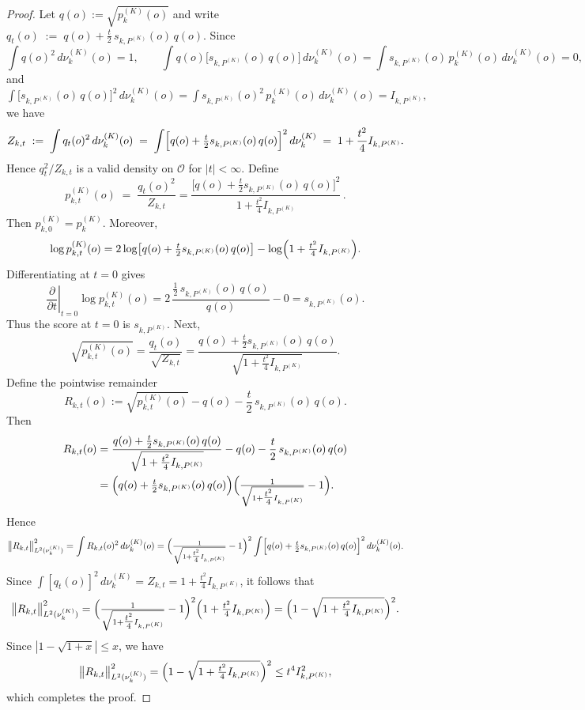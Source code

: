 \documentclass[11pt]{article}
\theoremstyle{plain}
\theoremstyle{definition}
\theoremstyle{remark}
\theoremstyle{definition}
\begin{document}
\begin{proof}
Let $q(o):=\sqrt{p_k^{(K)}(o)}$ and write $q_t(o)\;:=\;q(o)+\frac{t}{2}\,s_{k,P^{(K)}}(o)\,q(o).$
Since 
\[
\int q(o)^2\,d\nu_k^{(K)}(o)=1,\qquad
\int q(o)\bigl[s_{k,P^{(K)}}(o)\,q(o)\bigr]\,d\nu_k^{(K)}(o)
=\int s_{k,P^{(K)}}(o)\,p_k^{(K)}(o)\,d\nu_k^{(K)}(o)=0,
\]
and $\int\bigl[s_{k,P^{(K)}}(o)\,q(o)\bigr]^2\,d\nu_k^{(K)}(o)
=\int s_{k,P^{(K)}}(o)^2\,p_k^{(K)}(o)\,d\nu_k^{(K)}(o)
=I_{k,P^{(K)}},$
we have
\[
Z_{k,t}\;:=\;\int q_t(o)^2\,d\nu_k^{(K)}(o)
\;=\;\int\Bigl[q(o)+\tfrac{t}{2}s_{k,P^{(K)}}(o)\,q(o)\Bigr]^2\,d\nu_k^{(K)}
\;=\;1+\frac{t^2}{4}I_{k,P^{(K)}}.
\]
Hence $q_t^2/Z_{k,t}$ is a valid density on $\mathcal O$ for $|t| < \infty$.  Define
\[
p_{k,t}^{(K)}(o)\;=\;\frac{q_t(o)^2}{Z_{k,t}}
=\frac{\bigl[q(o)+\tfrac{t}{2}s_{k,P^{(K)}}(o)\,q(o)\bigr]^2}
{\,1+\tfrac{t^2}{4}I_{k,P^{(K)}}\,}\,.
\]
Then $p_{k,0}^{(K)}=p_k^{(K)}$.  Moreover, 
\[
\log p_{k,t}^{(K)}(o)
=2\log\bigl[q(o)+\tfrac{t}{2}s_{k,P^{(K)}}(o)\,q(o)\bigr]
-\log\Bigl(1+\tfrac{t^2}{4}I_{k,P^{(K)}}\Bigr).
\]
Differentiating at $t=0$ gives
\[
\left.\frac{\partial}{\partial t}\right|_{t=0}\log p_{k,t}^{(K)}(o)
=2\,\frac{\tfrac12\,s_{k,P^{(K)}}(o)\,q(o)}{q(o)}-0
=s_{k,P^{(K)}}(o).
\]
Thus the score at $t=0$ is $s_{k,P^{(K)}}$.  Next, 
\[
\sqrt{p_{k,t}^{(K)}(o)}
=\frac{q_t(o)}{\sqrt{Z_{k,t}}}
=\frac{q(o)+\tfrac{t}{2}s_{k,P^{(K)}}(o)\,q(o)}{\sqrt{1+\tfrac{t^2}{4}I_{k,P^{(K)}}}}.
\]
Define the pointwise remainder
\[
R_{k,t}(o)
:=\sqrt{p_{k,t}^{(K)}(o)}-q(o)-\frac{t}{2}\,s_{k,P^{(K)}}(o)\,q(o).
\]
Then
\begin{align*}
R_{k,t}(o)
&=\frac{q(o)+\tfrac{t}{2}s_{k,P^{(K)}}(o)\,q(o)}{\sqrt{1+\tfrac{t^2}{4}I_{k,P^{(K)}}}}
-q(o)-\frac{t}{2}\,s_{k,P^{(K)}}(o)\,q(o)\\
&=\Bigl(q(o)+\tfrac{t}{2}s_{k,P^{(K)}}(o)\,q(o)\Bigr)
\Bigl(\tfrac{1}{\sqrt{1+\tfrac{t^2}{4}I_{k,P^{(K)}}}}-1\Bigr).
\end{align*}
Hence 
\[
\bigl\lVert R_{k,t}\bigr\rVert_{L^2(\nu_k^{(K)})}^2
=\int R_{k,t}(o)^2\,d\nu_k^{(K)}(o)
=\Bigl(\tfrac{1}{\sqrt{1+\tfrac{t^2}{4}I_{k,P^{(K)}}}}-1\Bigr)^2
\int\Bigl[q(o)+\tfrac{t}{2}s_{k,P^{(K)}}(o)\,q(o)\Bigr]^2\,d\nu_k^{(K)}(o).
\]
Since $\int[q_t(o)]^2\,d\nu_k^{(K)}=Z_{k,t}=1+\tfrac{t^2}{4}I_{k,P^{(K)}}$, it follows that
\[
\bigl\lVert R_{k,t}\bigr\rVert_{L^2(\nu_k^{(K)})}^2
=\Bigl(\tfrac{1}{\sqrt{1+\tfrac{t^2}{4}I_{k,P^{(K)}}}}-1\Bigr)^2
\Bigl(1+\tfrac{t^2}{4}I_{k,P^{(K)}}\Bigr)
=\Bigl(1-\sqrt{1+\tfrac{t^2}{4}I_{k,P^{(K)}}}\Bigr)^2.
\]
Since $|1 - \sqrt{1+x}|\leq x$, we have 
\[
\bigl\lVert R_{k,t}\bigr\rVert_{L^2(\nu_k^{(K)})}^2
=\Bigl(1-\sqrt{1+\tfrac{t^2}{4}I_{k,P^{(K)}}}\Bigr)^2  \leq t^4  I_{k,P^{(K)}}^2,
\]
which completes the proof.
\end{proof}
\end{document}
